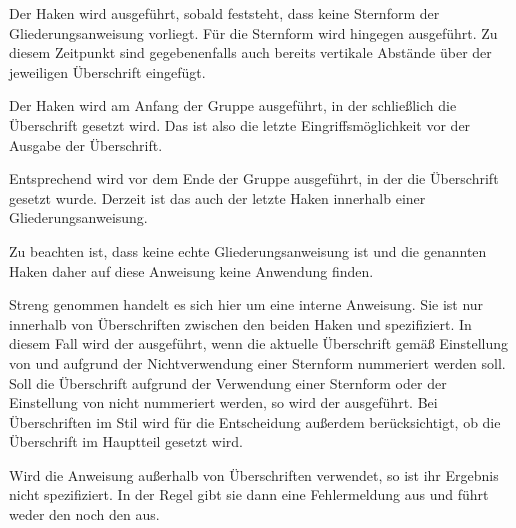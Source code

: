 Der Haken 
 wird ausgeführt, sobald feststeht,
dass keine Sternform der Gliederungsanweisung vorliegt. Für die Sternform wird
hingegen  ausgeführt. Zu diesem
Zeitpunkt sind gegebenenfalls auch bereits vertikale Abstände über der
jeweiligen Überschrift eingefügt.

Der Haken
 wird am Anfang der Gruppe
ausgeführt, in der schließlich die Überschrift gesetzt wird. Das ist also die
letzte Eingriffsmöglichkeit vor der Ausgabe der Überschrift.

Entsprechend wird
 vor dem Ende der Gruppe ausgeführt, in
der die Überschrift gesetzt wurde. Derzeit ist das auch der letzte Haken
innerhalb einer Gliederungsanweisung.

Zu beachten ist, dass
 keine echte Gliederungsanweisung ist und die
genannten Haken daher auf diese Anweisung keine Anwendung finden.%
\EndIndexGroup


\begin{Declaration}
\end{Declaration}
Streng genommen handelt es sich hier um eine interne
Anweisung. Sie ist nur innerhalb von Überschriften zwischen den beiden Haken
 und 
spezifiziert. In diesem Fall wird der  ausgeführt, wenn die
aktuelle Überschrift gemäß Einstellung von
 und aufgrund der Nichtverwendung einer
Sternform nummeriert werden soll. Soll die Überschrift aufgrund der Verwendung
einer Sternform oder der Einstellung von 
nicht nummeriert werden, so wird der  ausgeführt. Bei
Überschriften im Stil  wird für die Entscheidung außerdem
berücksichtigt, ob die Überschrift im Hauptteil gesetzt wird.

Wird die Anweisung außerhalb von
Überschriften verwendet, so ist ihr Ergebnis nicht spezifiziert. In der Regel
gibt sie dann eine Fehlermeldung aus und führt weder den 
noch den  aus.%
\EndIndexGroup


